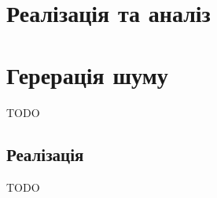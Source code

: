 \documentclass[14pt,a4paper]{extarticle}
\newcounter{e}
\numberwithin{equation}{section}
\numberwithin{figure}{section}
\begin{document}
	\begingroup
	\setlength{\abovedisplayskip}{0pt}
	\setlength{\belowdisplayskip}{0pt}
	

	
	
	
	\begin{comment}
	\begin{algorithm}
		\caption{Градієнтний спуск}
		\label{alg:gradient_descent}
		\begin{algorithmic}[1]
			\State \algorithmicrequire{Тренувальні дані $X, Y$, гіперпараметри: $N$, $\varepsilon$, $\alpha$}
			\State \algorithmicensure{ Оптимальні параметри моделі $w, b$}
			\State i = 0
			\While{ i $< N$ або ( $\|dw\| < \varepsilon$ та $\|db\| < \varepsilon$ )}
			\State $dw = \alpha \pdv{J(w, b)}{w}$
			\State $db = \alpha \pdv{J(w, b)}{b}$
			\State $\omega = \omega - dw$
			\State $b = b - db$
			\State i += 1
			\EndWhile
			\State \algorithmreturn{$\omega, b$}.
		\end{algorithmic}
	\end{algorithm}
	\end{comment}
	
	\begin{comment}
	\section{Датасет}
	В якості тренувального датасету будемо використовувати MNIST базу даних яка складається з 60 тис. тренувальних та 10 тис. тестувальних зображень рукописних цифр \ref{fig:minist_dataset}. Розмір кожного із них складає $28 \times 28$, а значення їх пікселів знаходяться в проміжку $[0, 255]$. На основі неї будемо здійснюватись тренування моделі і аналіз методів атак та захисту.
	\end{comment}


	\newpage
	\thispagestyle{empty}
	\section{Реалізація та аналіз}
	
	\section{Герерація шуму}
	TODO
	
	\subsection{Реалізація}
	TODO
\end{document}
